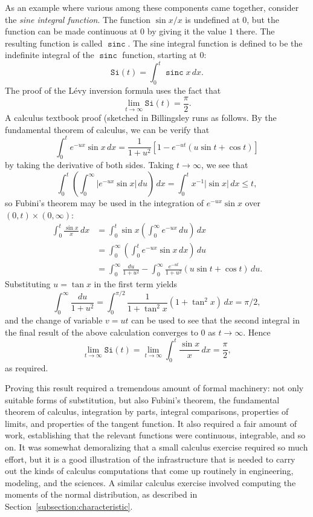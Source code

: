 \documentclass{svjour3}
\newcommand{\fn}[1]{\mathtt{#1}} %
\newcommand{\sinc}{\mathop{\fn{sinc}}\nolimits}
\begin{document}
As an example where various among these components came together, consider the \emph{sine integral function}. The function $\sin x / x$ is undefined at $0$, but the function can be made continuous at $0$ by giving it the value $1$ there. The resulting function is called $\sinc$. The sine integral function is defined to be the indefinite integral of the $\sinc$ function, starting at $0$:
\[ 
\fn{Si}(t) = \int_0^t \sinc x \, dx. 
\]
The proof of the L\'evy inversion formula uses the fact that 
\[ 
\lim_{t \rightarrow \infty} \fn{Si}(t) = \frac{\pi}{2}.
\]
A calculus textbook proof (sketched in Billingsley \cite[Example 18.4]{billingsley:95} runs as follows. By the fundamental theorem of calculus, we can be verify that
\[ 
\int_0^t e^{-ux} \sin x \, dx = \frac{1}{1+u^2}[1 - e^{-ut}(u \sin t + \cos t)] 
\]
by taking the derivative of both sides.  Taking $t \rightarrow \infty$, we see that
\[ 
\int_0^t \left( \int_0^\infty |e^{-ux} \sin x| \, du\right) \, dx = \int_0^t x^{-1} |\sin x| \, dx \le t,
\]
so Fubini's theorem may be used in the integration of $e^{-ux} \sin x$ over $(0,t) \times (0, \infty)$:
\begin{align*}
\int_0^t \frac{\sin x}{x} \, dx &= \int_0^t \sin x \left(\int_0^\infty e^{-ux} \, du\right) \, dx \\
                                &= \int_0^\infty \left(\int_0^t e^{-ux} \sin x \, dx\right) \, du \\
                                &= \int_0^\infty \frac{du}{1+u^2} - \int_0^\infty \frac{e^{-ut}}{1+u^2} (u \sin t + \cos t) \, du.
\end{align*}
Substituting $u = \tan x$ in the first term yields
\[
 \int_0^\infty \frac{du}{1+u^2} = \int_0^{\pi/2} \frac{1}{1 + \tan^2 x} (1 + \tan^2 x) \, dx = \pi/2,
\]
and the change of variable $v = ut$ can be used to see that the second integral in the final result of the above calculation converges to $0$ as $t \rightarrow \infty$. Hence
\[ 
\lim_{t \rightarrow \infty} \fn{Si}(t) = \lim_{t \rightarrow \infty} \int_0^t \frac{\sin x}{x} \, dx = \frac{\pi}{2},
\]
as required. 

Proving this result required a tremendous amount of formal machinery: not only suitable forms of substitution, but also Fubini's theorem, the fundamental theorem of calculus, integration by parts, integral comparisons, properties of limits, and properties of the tangent function. It also required a fair amount of work, establishing that the relevant functions were continuous, integrable, and so on. It was somewhat demoralizing that a small calculus exercise required so much effort, but it is a good illustration of the infrastructure that is needed to carry out the kinds of calculus computations that come up routinely in engineering, modeling, and the sciences. A similar calculus exercise involved computing the moments of the normal distribution, as described in Section~\ref{subsection:characteristic}.
\end{document}
